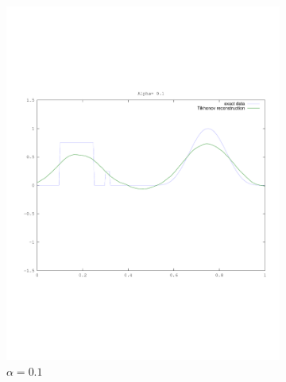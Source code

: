 \documentclass{article}
\begin{document}
\begin{figure}[!htb]
\begin{subfigure}[bh]{0.45\textwidth}
                \includegraphics[width=\textwidth]{plots/reconstruct01.pdf}
                \caption{$\alpha=0.1$}
        \end{subfigure}%
        \begin{subfigure}[bh]{0.45\textwidth}

\end{subfigure}
\end{figure}
\end{document}
